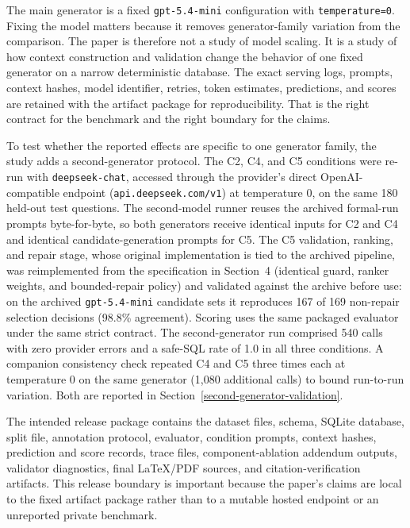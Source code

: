 \documentclass{ieeeaccess}
\begin{document}
The main generator is a fixed \texttt{gpt-5.4-mini} configuration with \texttt{temperature=0}. Fixing the model matters because it removes generator-family variation from the comparison. The paper is therefore not a study of model scaling. It is a study of how context construction and validation change the behavior of one fixed generator on a narrow deterministic database. The exact serving logs, prompts, context hashes, model identifier, retries, token estimates, predictions, and scores are retained with the artifact package for reproducibility. That is the right contract for the benchmark and the right boundary for the claims.

To test whether the reported effects are specific to one generator family, the study adds a second-generator protocol. The C2, C4, and C5 conditions were re-run with \texttt{deepseek-chat}, accessed through the provider's direct OpenAI-compatible endpoint (\texttt{api.deepseek.com/v1}) at temperature 0, on the same 180 held-out test questions. The second-model runner reuses the archived formal-run prompts byte-for-byte, so both generators receive identical inputs for C2 and C4 and identical candidate-generation prompts for C5. The C5 validation, ranking, and repair stage, whose original implementation is tied to the archived pipeline, was reimplemented from the specification in Section~4 (identical guard, ranker weights, and bounded-repair policy) and validated against the archive before use: on the archived \texttt{gpt-5.4-mini} candidate sets it reproduces 167 of 169 non-repair selection decisions (98.8\% agreement). Scoring uses the same packaged evaluator under the same strict contract. The second-generator run comprised 540 calls with zero provider errors and a safe-SQL rate of 1.0 in all three conditions. A companion consistency check repeated C4 and C5 three times each at temperature 0 on the same generator (1{,}080 additional calls) to bound run-to-run variation. Both are reported in Section~\ref{second-generator-validation}.

The intended release package contains the dataset files, schema, SQLite database, split file, annotation protocol, evaluator, condition prompts, context hashes, prediction and score records, trace files, component-ablation addendum outputs, validator diagnostics, final \LaTeX/PDF sources, and citation-verification artifacts. This release boundary is important because the paper's claims are local to the fixed artifact package rather than to a mutable hosted endpoint or an unreported private benchmark.
\end{document}
